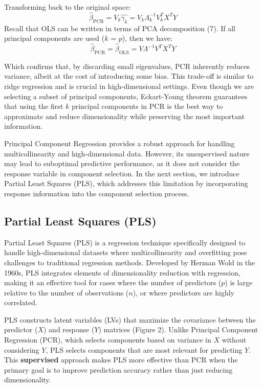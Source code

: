 \documentclass[11pt,twoside,a4paper]{article}
\begin{document}
Transforming back to the original space:
\begin{equation}
\hat{\beta}_{\text{PCR}} = V_k \hat{\gamma_k} = V_k \Lambda_k^{-1} V_k^T X^T Y
\end{equation}
Recall that OLS can be written in terms of PCA decomposition (7). If all principal components are used (\( k \) = \( p \)), then we have:
\begin{equation}
\hat{\beta}_{\text{PCR}} = \hat{\beta}_{\text{OLS}} = V \Lambda^{-1} V^T X^T Y
\end{equation}

Which confirms that, by discarding small eigenvalues, PCR inherently reduces variance, albeit at the cost of introducing some bias. This trade-off is similar to ridge regression and is crucial in high-dimensional settings. Even though we are selecting a subset of principal components, Eckart-Young theorem guarantees that using the first \( k \) principal components in PCR is the best way to approximate and reduce dimensionality while preserving the most important information.

Principal Component Regression provides a robust approach for handling multicollinearity and high-dimensional data. However, its unsupervised nature may lead to suboptimal predictive performance, as it does not consider the response variable in component selection. In the next section, we introduce Partial Least Squares (PLS), which addresses this limitation by incorporating response information into the component selection process.

\subsection{Partial Least Squares (PLS)}

Partial Least Squares (PLS) is a regression technique specifically designed to handle high-dimensional datasets where multicollinearity and overfitting pose challenges to traditional regression methods. Developed by Herman Wold in the 1960s, PLS integrates elements of dimensionality reduction with regression, making it an effective tool for cases where the number of predictors (\( p \)) is large relative to the number of observations (\( n \)), or where predictors are highly correlated.

PLS constructs latent variables (LVs) that maximize the covariance between the predictor (\(X\)) and response (\(Y\)) matrices (Figure 2). Unlike Principal Component Regression (PCR), which selects components based on variance in \( X \) without considering \( Y \), PLS selects components that are most relevant for predicting \( Y \). This \textbf{supervised} approach makes PLS more effective than PCR when the primary goal is to improve prediction accuracy rather than just reducing dimensionality.
\end{document}
